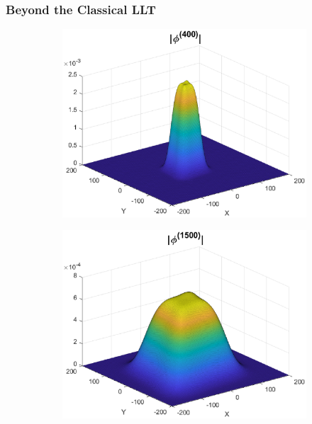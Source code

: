\documentclass{beamer}
\theoremstyle{definition}
\begin{document}
\begin{frame}
\frametitle{Beyond the Classical LLT}

\begin{figure}[!htb]
	\begin{subfigure}{0.495\textwidth}
		\centering
		\includegraphics[width=\textwidth]{Abs_400.eps}
	\end{subfigure}
	\begin{subfigure}{0.495\textwidth}
		\centering
		\includegraphics[width=\textwidth]{Abs_1500.eps}
	\end{subfigure}
\end{figure}



\end{frame}
\end{document}
